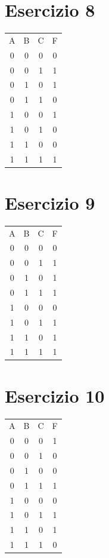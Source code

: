 \documentclass[a4paper,12pt]{article}
\begin{document}
	\section*{Esercizio 8}
	
	\begin{tabular}{c c c | c}
		A & B & C & F \\
		0 & 0 & 0 & 0 \\
		0 & 0 & 1 & 1 \\
		0 & 1 & 0 & 1 \\
		0 & 1 & 1 & 0 \\
		1 & 0 & 0 & 1 \\
		1 & 0 & 1 & 0 \\
		1 & 1 & 0 & 0 \\
		1 & 1 & 1 & 1 \\
	\end{tabular}
	
	\section*{Esercizio 9}
	
	\begin{tabular}{c c c | c}
		A & B & C & F \\
		0 & 0 & 0 & 0 \\
		0 & 0 & 1 & 1 \\
		0 & 1 & 0 & 1 \\
		0 & 1 & 1 & 1 \\
		1 & 0 & 0 & 0 \\
		1 & 0 & 1 & 1 \\
		1 & 1 & 0 & 1 \\
		1 & 1 & 1 & 1 \\
	\end{tabular}
	
	\section*{Esercizio 10}
	
	\begin{tabular}{c c c | c}
		A & B & C & F \\
		0 & 0 & 0 & 1 \\
		0 & 0 & 1 & 0 \\
		0 & 1 & 0 & 0 \\
		0 & 1 & 1 & 1 \\
		1 & 0 & 0 & 0 \\
		1 & 0 & 1 & 1 \\
		1 & 1 & 0 & 1 \\
		1 & 1 & 1 & 0 \\
	\end{tabular}
	
\end{document}
